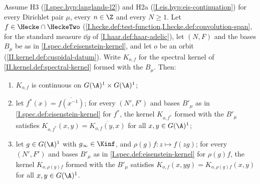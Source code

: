 Assume H3 (\cref{I.spec.hyp:langlands-l2}) and H2a (\cref{I.eis.hyp:eis-continuation}) for every Dirichlet pair $\mu$, every $n\in\Z$ and every $N\ge1$. Let
$f\in\Hecke\cap\HeckeTwo$ (\cref{I.hecke.def:test-function,I.hecke.def:convolution-span}, for the standard measure $\dd g$ of \cref{I.haar.def:haar-adelic}), let
$(N,F)$ and the bases $B_\mu$ be as in \cref{I.spec.def:eisenstein-kernel}, and let $o$ be an orbit (\cref{II.kernel.def:cuspidal-datum}). Write $K_{o,f}$ for the spectral
kernel of \cref{II.kernel.def:spectral-kernel} formed with the $B_\mu$. Then:
\begin{enumerate}[label=(\alph*)]
\item $K_{o,f}$ is continuous on $G(\A)^1\times G(\A)^1$;
\item let $f^*(x)=\overline{f(x^{-1})}$; for every $(N',F')$ and bases $B'_\mu$ as in \cref{I.spec.def:eisenstein-kernel} for $f^*$,
  the kernel $K_{o,f^*}$ formed with the $B'_\mu$ satisfies $K_{o,f^*}(x,y)=\overline{K_{o,f}(y,x)}$ for all $x,y\in G(\A)^1$;
\item let $g\in G(\A)^1$ with $g_\infty\in\Kinf$, and $\rho(g)f\colon z\mapsto f(zg)$; for every $(N',F')$ and bases $B'_\mu$ as in \cref{I.spec.def:eisenstein-kernel} for
  $\rho(g)f$, the kernel $K_{o,\rho(g)f}$ formed with the $B'_\mu$ satisfies $K_{o,f}(x,yg)=K_{o,\rho(g)f}(x,y)$ for all $x,y\in G(\A)^1$.
\end{enumerate}
